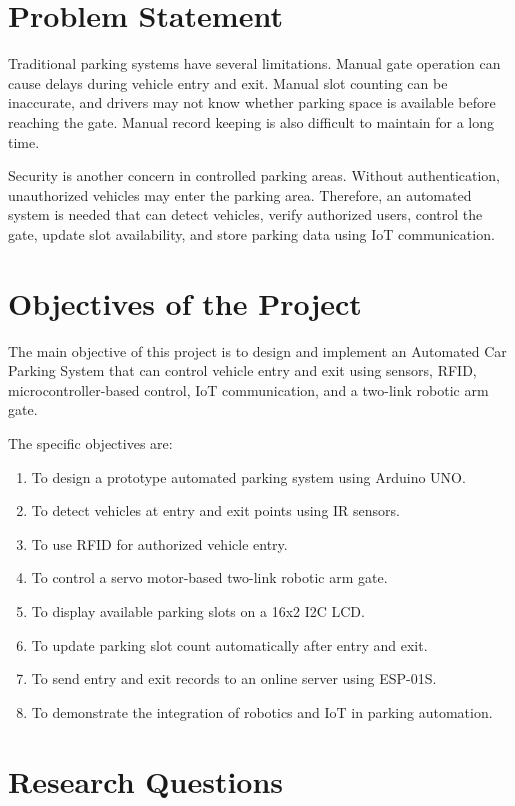 \section{Problem Statement}

Traditional parking systems have several limitations. Manual gate operation can cause delays during vehicle entry and exit. Manual slot counting can be inaccurate, and drivers may not know whether parking space is available before reaching the gate. Manual record keeping is also difficult to maintain for a long time.

Security is another concern in controlled parking areas. Without authentication, unauthorized vehicles may enter the parking area. Therefore, an automated system is needed that can detect vehicles, verify authorized users, control the gate, update slot availability, and store parking data using IoT communication.

\section{Objectives of the Project}

The main objective of this project is to design and implement an Automated Car Parking System that can control vehicle entry and exit using sensors, RFID, microcontroller-based control, IoT communication, and a two-link robotic arm gate.

The specific objectives are:

\begin{enumerate}
    \item To design a prototype automated parking system using Arduino UNO.
    \item To detect vehicles at entry and exit points using IR sensors.
    \item To use RFID for authorized vehicle entry.
    \item To control a servo motor-based two-link robotic arm gate.
    \item To display available parking slots on a 16x2 I2C LCD.
    \item To update parking slot count automatically after entry and exit.
    \item To send entry and exit records to an online server using ESP-01S.
    \item To demonstrate the integration of robotics and IoT in parking automation.
\end{enumerate}

\section{Research Questions}

